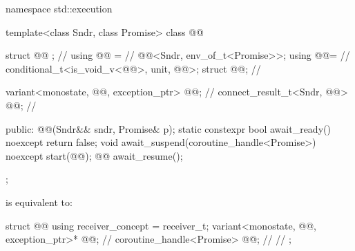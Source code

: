 \begin{codeblock}
namespace std::execution {
  template<class Sndr, class Promise>
  class @@ {
    struct @@ {};                                             // \expos
    using @@ =                                          // \expos
      @@<Sndr, env_of_t<Promise>>;
    using @@=                                         // \expos
      conditional_t<is_void_v<@@>, unit, @@>;
    struct @@;                                  // \expos

    variant<monostate, @@, exception_ptr> @@{};    // \expos
    connect_result_t<Sndr, @@> @@;           // \expos

  public:
    @@(Sndr&& sndr, Promise& p);
    static constexpr bool await_ready() noexcept { return false; }
    void await_suspend(coroutine_handle<Promise>) noexcept { start(@@); }
    @@ await_resume();
  };
}
\end{codeblock}

\pnum
{} is equivalent to:
\begin{codeblock}
struct @@ {
  using receiver_concept = receiver_t;
  variant<monostate, @@, exception_ptr>* @@;   // \expos
  coroutine_handle<Promise> @@;                       // \expos
  // \seebelow
};
\end{codeblock}

